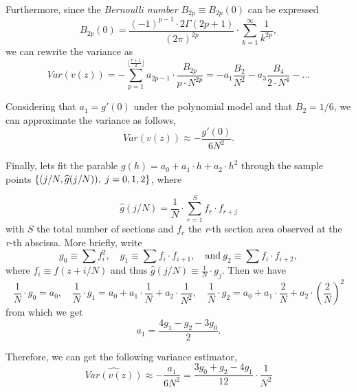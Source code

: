 Furthermore, since the \textit{Bernoulli number} $B_{2p} \equiv B_{2p}(0)$ can be expressed
\begin{equation*}
    B_{2p}(0) = \frac{(-1)^{p-1} \cdot 2\Gamma (2p+1)}{(2\pi)^{2p}} \cdot \sum_{k=1}^{\infty} \frac{1}{k^{2p}},
\end{equation*}
we can rewrite the variance as
\begin{equation*}
    Var(v(z)) = -\sum_{p=1}^{\lfloor \frac{r+1}{2} \rfloor} a_{2p-1} \cdot \frac{B_{2p}}{p \cdot N^{2p}} = -a_1  \frac{B_2}{N^{2}} -  a_3  \frac{B_4}{2 \cdot N^{4}} - ...
\end{equation*}

Considering that $a_1 = g'(0)$ under the polynomial model and that $B_2 = 1/6$, we can approximate the variance as follows,
\begin{equation*}
    Var(v(z)) \approx -  \frac{g'(0)}{6N^{2}}.
\end{equation*}

Finally, lets fit the parable $g(h) = a_0 + a_1 \cdot h + a_2 \cdot h^2$ through the sample points $\{ (j/N,\widehat{g}(j/N)), \hspace{1mm} j=0,1,2 \}$, where


\begin{equation*}
    \widehat{g}(j/N) = \frac{1}{N}\cdot \sum_{r=1}^{S} f_r \cdot f_{r+j}
\end{equation*}
with $S$ the total number of sections and $f_r$ the \textit{r}-th section area observed at the \textit{r}-th abscissa. More briefly, write
\begin{equation*}
    g_0 \equiv \sum f_i^2,\quad 
    g_1 \equiv \sum f_i \cdot f_{i+1},\quad
\mathrm{ and} \
    g_2 \equiv \sum f_i \cdot f_{i+2},
\end{equation*}
where $f_i \equiv f(z+i/N)$ and thus $\widehat{g}(j/N) \equiv \frac{1}{N}\cdot g_j$.
Then we have
\begin{equation*}
    \frac{1}{N} \cdot g_0 = a_0,\quad
    \frac{1}{N} \cdot g_1 = a_0 + a_1 \cdot \frac{1}{N} + a_2 \cdot \frac{1}{N^2},\quad 
    \frac{1}{N} \cdot g_2 = a_0 + a_1 \cdot \frac{2}{N} + a_2 \cdot \left(\frac{2}{N}\right)^2
\end{equation*}
from which we get
\begin{equation*}
    a_1 = \frac{4g_1 - g_2 - 3g_0}{2}.
\end{equation*}
\vspace{2mm}

Therefore, we can get the following variance estimator,
\begin{equation*}
    \widehat{Var(v(z))} \approx - \frac{a_1}{6N^2} = \frac{3g_0 + g_2 - 4g_1}{12} \cdot \frac{1}{N^2}
\end{equation*}

